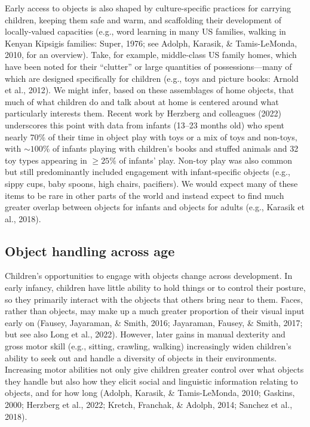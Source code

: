 \documentclass[10pt, letterpaper]{article}
\begin{document}
Early access to objects is also shaped by culture-specific practices for
carrying children, keeping them safe and warm, and scaffolding their
development of locally-valued capacities (e.g., word learning in many US
families, walking in Kenyan Kipsigis families: Super, 1976; see Adolph,
Karasik, \& Tamis-LeMonda, 2010, for an overview). Take, for example,
middle-class US family homes, which have been noted for their
``clutter'' or large quantities of possessions---many of which are
designed specifically for children (e.g., toys and picture books: Arnold
et al., 2012). We might infer, based on these assemblages of home
objects, that much of what children do and talk about at home is
centered around what particularly interests them. Recent work by
Herzberg and colleagues (2022) underscores this point with data from
infants (13--23 months old) who spent nearly 70\% of their time in
object play with toys or a mix of toys and non-toys, with
\({\sim}100\%\) of infants playing with children's books and stuffed
animals and 32 toy types appearing in \({\ge}25\%\) of infants' play.
Non-toy play was also common but still predominantly included engagement
with infant-specific objects (e.g., sippy cups, baby spoons, high
chairs, pacifiers). We would expect many of these items to be rare in
other parts of the world and instead expect to find much greater overlap
between objects for infants and objects for adults (e.g., Karasik et
al., 2018).

\hypertarget{object-handling-across-age}{%
\subsection{Object handling across
age}\label{object-handling-across-age}}

Children's opportunities to engage with objects change across
development. In early infancy, children have little ability to hold
things or to control their posture, so they primarily interact with the
objects that others bring near to them. Faces, rather than objects, may
make up a much greater proportion of their visual input early on
(Fausey, Jayaraman, \& Smith, 2016; Jayaraman, Fausey, \& Smith, 2017;
but see also Long et al., 2022). However, later gains in manual
dexterity and gross motor skill (e.g., sitting, crawling, walking)
increasingly widen children's ability to seek out and handle a diversity
of objects in their environments. Increasing motor abilities not only
give children greater control over what objects they handle but also how
they elicit social and linguistic information relating to objects, and
for how long (Adolph, Karasik, \& Tamis-LeMonda, 2010; Gaskins, 2000;
Herzberg et al., 2022; Kretch, Franchak, \& Adolph, 2014; Sanchez et
al., 2018).
\end{document}
